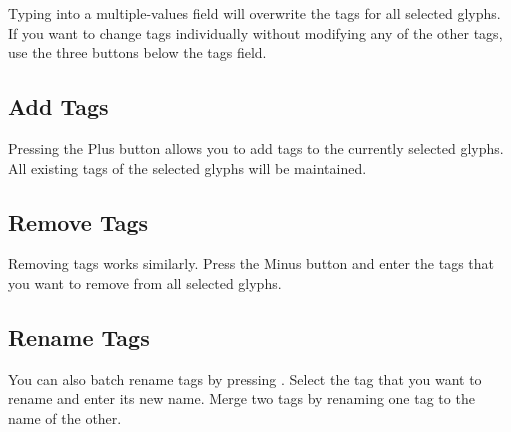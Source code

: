 \bigbreak\noindent%

\bigbreak\noindent Typing into a multiple-values field will overwrite the tags for all selected glyphs.
If you want to change tags individually without modifying any of the other tags, use the three buttons below the tags field.

\subsection{Add Tags}%
\label{sub:add_tags}

Pressing the Plus  button allows you to add tags to the currently selected glyphs.
All existing tags of the selected glyphs will be maintained.

\medbreak\noindent%

\subsection{Remove Tags}%
\label{sub:remove_tags}

Removing tags works similarly.
Press the Minus  button and enter the tags that you want to remove from all selected glyphs.

\medbreak\noindent%

\subsection{Rename Tags}%
\label{sub:rename_tags}

You can also batch rename tags by pressing .
Select the tag that you want to rename and enter its new name.
Merge two tags by renaming one tag to the name of the other.

\medbreak\noindent%
